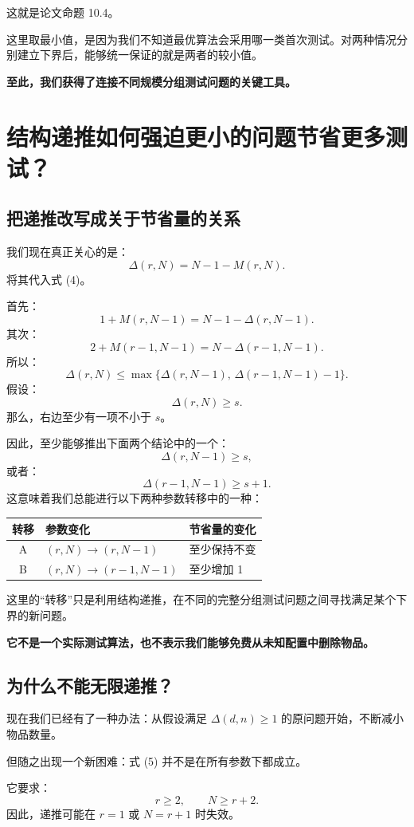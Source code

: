 \documentclass[UTF8,11pt]{ctexart}
\begin{document}
这就是论文命题 10.4。

这里取最小值，是因为我们不知道最优算法会采用哪一类首次测试。对两种情况分别建立下界后，能够统一保证的就是两者的较小值。

\textbf{至此，我们获得了连接不同规模分组测试问题的关键工具。}

\section{结构递推如何强迫更小的问题节省更多测试？}
\subsection{把递推改写成关于节省量的关系}
我们现在真正关心的是：
\[\Delta(r,N)=N-1-M(r,N).\]
将其代入式 (4)。

首先：
\[1+M(r,N-1)=N-1-\Delta(r,N-1).\]
其次：
\[2+M(r-1,N-1)=N-\Delta(r-1,N-1).\]
所以：
\begin{equation}
\boxed{\Delta(r,N)\le\max\{\Delta(r,N-1),\,\Delta(r-1,N-1)-1\}.}
\tag{5}
\end{equation}
假设：
\[\Delta(r,N)\ge s.\]
那么，右边至少有一项不小于 $s$。

因此，至少能够推出下面两个结论中的一个：
\[\Delta(r,N-1)\ge s,\]
或者：
\[\Delta(r-1,N-1)\ge s+1.\]
这意味着我们总能进行以下两种参数转移中的一种：
\begin{center}
\begin{tabularx}{\linewidth}{c>{\centering\arraybackslash}X>{\centering\arraybackslash}X}
\toprule 转移&参数变化&节省量的变化\\\midrule
A&$(r,N)\to(r,N-1)$&至少保持不变\\
B&$(r,N)\to(r-1,N-1)$&至少增加 1\\\bottomrule
\end{tabularx}
\end{center}
这里的“转移”只是利用结构递推，在不同的完整分组测试问题之间寻找满足某个下界的新问题。

\textbf{它不是一个实际测试算法，也不表示我们能够免费从未知配置中删除物品。}

\subsection{为什么不能无限递推？}
现在我们已经有了一种办法：从假设满足 $\Delta(d,n)\ge1$ 的原问题开始，不断减小物品数量。

但随之出现一个新困难：式 (5) 并不是在所有参数下都成立。

它要求：
\[r\ge2,\qquad N\ge r+2.\]
因此，递推可能在 $r=1$ 或 $N=r+1$ 时失效。
\end{document}
